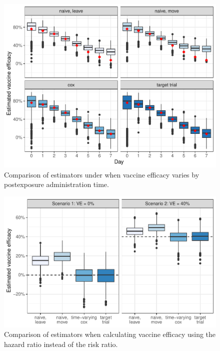 \begin{appendix}
    \clearpage

    \begin{figure}[p]
        \centering
        \includegraphics{../../../../3_figures/sim_hetx.pdf}
        \caption{Comparison of estimators under when vaccine efficacy varies by postexposure administration time.\label{fig:sim_hetx}}
    \end{figure}

    \begin{figure}[p]
        \centering
        \includegraphics{../../../../3_figures/sim_hr.pdf}
        \caption{Comparison of estimators when calculating vaccine efficacy using the hazard ratio instead of the risk ratio.\label{fig:sim_hr}}
    \end{figure}


\end{appendix}
